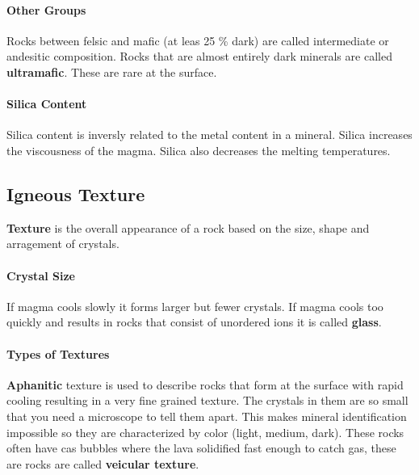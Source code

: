 \documentclass{article}
\begin{document}
\paragraph{Other Groups} %
\label{par:other_groups}
Rocks between felsic and mafic (at leas 25 \% dark) are called intermediate or andesitic composition. Rocks that are almost entirely dark minerals are called \textbf{ultramafic}. These are rare at the surface.

\paragraph{Silica Content} %
\label{par:silica_content}
Silica content is inversly related to the metal content in a mineral. Silica increases the viscousness of the magma. Silica also decreases the melting temperatures.


\subsection{Igneous Texture} %
\label{sub:igneous_texture}
\textbf{Texture} is the overall appearance of a rock based on the size, shape and arragement of crystals.

\paragraph{Crystal Size} %
\label{par:crystal_size}
If magma cools slowly it forms larger but fewer crystals. If magma cools too quickly and results in rocks that consist of unordered ions it is called \textbf{glass}.

\paragraph{Types of Textures} %
\label{par:types_of_textures}


\textbf{Aphanitic} texture is used to describe rocks that form at the surface with rapid cooling resulting in a very fine grained texture. The crystals in them are so small that you need a microscope to tell them apart. This makes mineral identification impossible so they are characterized by color (light, medium, dark). These rocks often have cas bubbles where the lava solidified fast enough to catch gas, these are rocks are called \textbf{veicular texture}.
\end{document}
